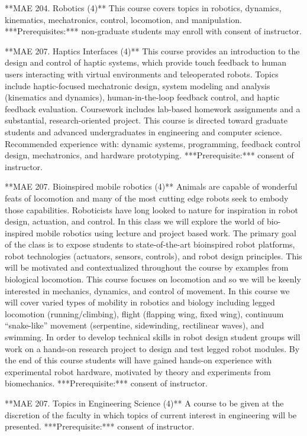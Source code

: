 \documentclass[11pt,letterpaper]{article}
\begin{document}
**MAE 204. Robotics (4)** This course covers topics in robotics,
dynamics, kinematics, mechatronics, control, locomotion, and
manipulation. ***Prerequisites:*** non-graduate students may enroll with
consent of instructor.

**MAE 207. Haptics Interfaces (4)** This course provides an
introduction to the design and control of haptic systems, which
provide touch feedback to human users interacting with virtual
environments and teleoperated robots. Topics include haptic-focused
mechatronic design, system modeling and analysis (kinematics and
dynamics), human-in-the-loop feedback control, and haptic feedback
evaluation. Coursework includes lab-based homework assignments and a
substantial, research-oriented project. This course is directed toward
graduate students and advanced undergraduates in engineering and
computer science. Recommended experience with: dynamic systems,
programming, feedback control design, mechatronics, and hardware
prototyping. ***Prerequisite:*** consent of instructor.

**MAE 207. Bioinspired mobile robotics (4)** Animals are capable of
wonderful feats of locomotion and many of the most cutting edge robots
seek to embody those capabilities. Roboticists have long looked to
nature for inspiration in robot design, actuation, and control. In
this class we will explore the world of bio-inspired mobile robotics
using lecture and project based work. The primary goal of the class is
to expose students to state-of-the-art bioinspired robot platforms,
robot technologies (actuators, sensors, controls), and robot design
principles. This will be motivated and contextualized throughout the
course by examples from biological locomotion.  This course focuses on
locomotion and so we will be keenly interested in mechanics, dynamics,
and control of movement. In this course we will cover varied types of
mobility in robotics and biology including legged locomotion
(running/climbing), flight (flapping wing, fixed wing), continuum
“snake-like” movement (serpentine, sidewinding, rectilinear waves),
and swimming. In order to develop technical skills in robot design
student groups will work on a hands-on research project to design and
test legged robot modules. By the end of this course students will
have gained hands-on experience with experimental robot hardware,
motivated by theory and experiments from
biomechanics. ***Prerequisite:*** consent of instructor.

**MAE 207. Topics in Engineering Science (4)** A course to be
given at the discretion of the faculty in which topics of current
interest in engineering will be presented. ***Prerequisite:*** consent of
instructor.
 
\end{document}
